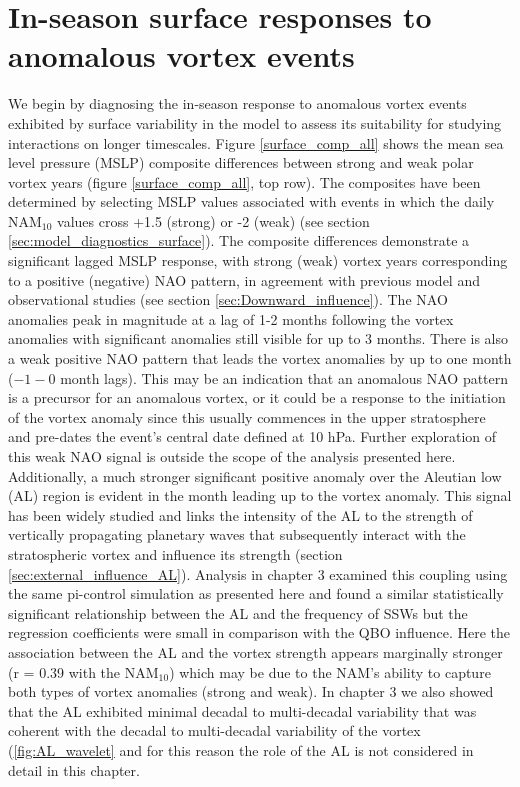 \section{In-season surface responses to anomalous vortex events}
We begin by diagnosing the in-season response to anomalous vortex events exhibited by surface variability in the model to assess its suitability for studying interactions on longer timescales. Figure \ref{surface_comp_all} shows the mean sea level pressure (MSLP) composite differences between strong and weak polar vortex years (figure \ref{surface_comp_all}, top row). The composites have been determined by selecting MSLP values associated with events in which the daily NAM$_{10}$ values cross +1.5 (strong) or -2 (weak) (see section \ref{sec:model_diagnostics_surface}). The composite differences demonstrate a significant lagged MSLP response, with strong (weak) vortex years  corresponding to a positive (negative) NAO pattern, in agreement with previous model and observational studies (see section \ref{sec:Downward_influence}). The NAO anomalies peak in magnitude at a lag of 1-2 months following the vortex anomalies with significant anomalies still visible for up to 3 months. There is also a weak positive NAO pattern that leads the vortex anomalies by up to one month ($-1 - 0$ month lags). This may be an indication that an anomalous NAO pattern is a precursor for an anomalous vortex, or it could be a response to the initiation of the vortex anomaly since this usually commences in the upper stratosphere and pre-dates the event's central date defined at 10 hPa. Further exploration of this weak NAO signal is outside the scope of the analysis presented here. Additionally, a much stronger significant positive anomaly over the Aleutian low (AL) region is evident in the month leading up to the vortex anomaly. This signal has been widely studied \citep{raoModulation2019a} and links the intensity of the AL to the strength of vertically propagating planetary waves that subsequently interact with the stratospheric vortex and influence its strength (section \ref{sec:external_influence_AL}). Analysis in chapter 3 examined this coupling using the same pi-control simulation as presented here and found a similar statistically significant relationship between the AL and the frequency of SSWs but the regression coefficients were small in comparison with the QBO influence. Here the association between the AL and the vortex strength appears marginally stronger (r = 0.39 with the NAM$_{10}$) which may be due to the NAM's ability to capture both types of vortex anomalies (strong and weak). In chapter 3 we also showed that the AL exhibited minimal decadal to multi-decadal variability that was coherent with the decadal to multi-decadal variability of the vortex (\ref{fig:AL_wavelet} and for this reason the role of the AL is not considered in detail in this chapter.

